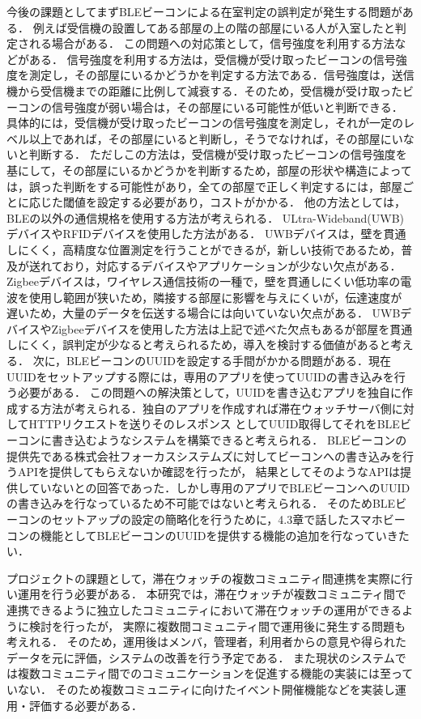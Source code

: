 今後の課題としてまずBLEビーコンによる在室判定の誤判定が発生する問題がある．
例えば受信機の設置してある部屋の上の階の部屋にいる人が入室したと判定される場合がある．
この問題への対応策として，信号強度を利用する方法などがある．
信号強度を利用する方法は，受信機が受け取ったビーコンの信号強度を測定し，その部屋にいるかどうかを判定する方法である．信号強度は，送信機から受信機までの距離に比例して減衰する．そのため，受信機が受け取ったビーコンの信号強度が弱い場合は，その部屋にいる可能性が低いと判断できる．
具体的には，受信機が受け取ったビーコンの信号強度を測定し，それが一定のレベル以上であれば，その部屋にいると判断し，そうでなければ，その部屋にいないと判断する．
ただしこの方法は，受信機が受け取ったビーコンの信号強度を基にして，その部屋にいるかどうかを判断するため，部屋の形状や構造によっては，誤った判断をする可能性があり，全ての部屋で正しく判定するには，部屋ごとに応じた閾値を設定する必要があり，コストがかかる．
他の方法としては，BLEの以外の通信規格を使用する方法が考えられる．
ULtra-Wideband(UWB)デバイスやRFIDデバイスを使用した方法がある．
UWBデバイスは，壁を貫通しにくく，高精度な位置測定を行うことができるが，新しい技術であるため，普及が送れており，対応するデバイスやアプリケーションが少ない欠点がある．
Zigbeeデバイスは，ワイヤレス通信技術の一種で，壁を貫通しにくい低功率の電波を使用し範囲が狭いため，隣接する部屋に影響を与えにくいが，伝達速度が
遅いため，大量のデータを伝送する場合には向いていない欠点がある．
UWBデバイスやZigbeeデバイスを使用した方法は上記で述べた欠点もあるが部屋を貫通しにくく，誤判定が少なると考えられるため，導入を検討する価値があると考える．
次に，BLEビーコンのUUIDを設定する手間がかかる問題がある．現在UUIDをセットアップする際には，専用のアプリを使ってUUIDの書き込みを行う必要がある．
この問題への解決策として，UUIDを書き込むアプリを独自に作成する方法が考えられる．独自のアプリを作成すれば滞在ウォッチサーバ側に対してHTTPリクエストを送りそのレスポンス
としてUUID取得してそれをBLEビーコンに書き込むようなシステムを構築できると考えられる．
BLEビーコンの提供先である株式会社フォーカスシステムズに対してビーコンへの書き込みを行うAPIを提供してもらえないか確認を行ったが，
結果としてそのようなAPIは提供していないとの回答であった．しかし専用のアプリでBLEビーコンへのUUIDの書き込みを行なっているため不可能ではないと考えられる．
そのためBLEビーコンのセットアップの設定の簡略化を行うために，4.3章で話したスマホビーコンの機能としてBLEビーコンのUUIDを提供する機能の追加を行なっていきたい．

プロジェクトの課題として，滞在ウォッチの複数コミュニティ間連携を実際に行い運用を行う必要がある．
本研究では，滞在ウォッチが複数コミュニティ間で連携できるように独立したコミュニティにおいて滞在ウォッチの運用ができるように検討を行ったが，
実際に複数間コミュニティ間で運用後に発生する問題も考えれる．
そのため，運用後はメンバ，管理者，利用者からの意見や得られたデータを元に評価，システムの改善を行う予定である．
また現状のシステムでは複数コミュニティ間でのコミュニケーションを促進する機能の実装には至っていない．
そのため複数コミュニティに向けたイベント開催機能などを実装し運用・評価する必要がある．


